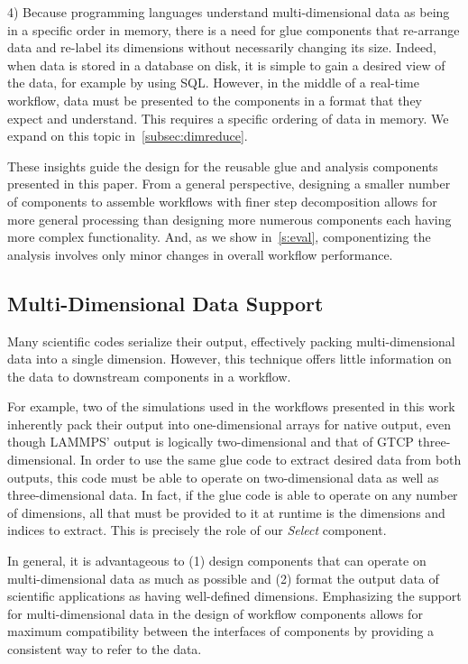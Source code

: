 4) Because programming languages understand
multi-dimensional data as being in a
specific order in memory, there is a need for
glue components that re-arrange data and
re-label its dimensions without necessarily
changing its size. Indeed, when data is stored
in a database on disk, it is simple to gain a desired
view of the data, for example by using SQL.
However, in the middle of a real-time workflow,
data must be presented to the components in a
format that they expect and understand.
This requires a specific ordering of data in
memory. We expand on this topic in~\autoref{subsec:dimreduce}.

These insights guide the design for the
reusable glue and analysis
components presented in this
paper. From a general perspective, designing a smaller number of
components to assemble workflows with finer step decomposition
allows for more general processing
than designing more numerous components each having more
complex functionality.
And, as we show in~\autoref{s:eval}, componentizing
the analysis involves only minor changes
in overall workflow performance.

\subsection{Multi-Dimensional Data Support}

Many scientific codes serialize their output, effectively packing
multi-dimensional data into a single dimension.
However, this technique offers
little information on the data to downstream
components in a workflow.

For example, two of the simulations used in the
workflows presented in this work inherently
pack their output into one-dimensional arrays
for native output, even
though LAMMPS' output is logically
two-dimensional and that
of GTCP three-dimensional.
In order to use the same glue code to
extract desired data from both outputs,
this code must be able to operate on two-dimensional data
as well as three-dimensional data.
In fact, if the glue code is able to operate
on any number of dimensions, all that must be provided to it
at runtime is the dimensions and indices to extract.
This is precisely the role of our
{\em Select} component.

In general, it is advantageous to (1) design
components that can operate on
multi-dimensional data as much as possible
and (2) format the output data of
scientific applications as having well-defined
dimensions. Emphasizing the support for multi-dimensional
data in the design of workflow components allows
for maximum compatibility between the interfaces
of components by providing a
consistent way to refer to the data.

